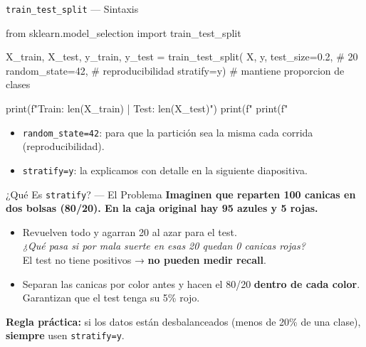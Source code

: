 \documentclass[aspectratio=169, 11pt]{beamer}
\begin{document}
\begin{frame}[fragile,shrink=10]{\texttt{train\_test\_split} --- Sintaxis}
  \vspace{-4pt}
  \begin{pyblock}
from sklearn.model_selection import train_test_split

X_train, X_test, y_train, y_test = train_test_split(
    X, y,
    test_size=0.2,        # 20%
    random_state=42,      # reproducibilidad
    stratify=y)           # mantiene proporcion de clases

print(f"Train: {len(X_train)}  |  Test: {len(X_test)}")
print(f"%
print(f"%
  \end{pyblock}

  \vspace{4pt}
  {\scriptsize\color{textMuted}
  \begin{itemize}\setlength{\itemsep}{3pt}
    \item[{\color{arcaRed}\scriptsize\faArrowRight}]
      \texttt{random\_state=42}: para que la partición sea la misma cada corrida
      (reproducibilidad).
    \item[{\color{arcaRed}\scriptsize\faArrowRight}]
      \texttt{stratify=y}: la explicamos con detalle en la siguiente diapositiva.
  \end{itemize}
  }
\end{frame}

\begin{frame}{¿Qué Es \texttt{stratify}? --- El Problema}
  \vspace{-4pt}
  {\footnotesize\color{arcaDark}\bfseries
    Imaginen que reparten \textbf{100 canicas} en dos bolsas (80/20).
    En la caja original hay 95 azules y 5 rojas.}

  \vspace{6pt}
  {\footnotesize
  \begin{itemize}\setlength{\itemsep}{5pt}
    \item[{\color{arcaRed}\bfseries Sin stratify:}]
      Revuelven todo y agarran 20 al azar para el test.\\
      \textit{¿Qué pasa si por mala suerte en esas 20 quedan 0 canicas rojas?}\\
      El test no tiene positivos → \textbf{no pueden medir recall}.
    \item[{\color{codeGreen}\bfseries Con stratify:}]
      Separan las canicas por color antes y hacen el 80/20
      \textbf{dentro de cada color}. Garantizan que el test tenga su 5\% rojo.
  \end{itemize}
  }

  \vspace{6pt}
  \begin{tcolorbox}[colback=arcaRed!8, colframe=arcaRed, boxrule=0.5pt, arc=2pt,
    left=6pt, right=6pt, top=4pt, bottom=4pt]
    {\scriptsize\color{arcaDark}
    \faExclamationTriangle\hspace{4pt}\textbf{Regla práctica:} si los datos
    están desbalanceados (menos de 20\% de una clase), \textbf{siempre}
    usen \texttt{stratify=y}.}
  \end{tcolorbox}
\end{frame}
\end{document}
